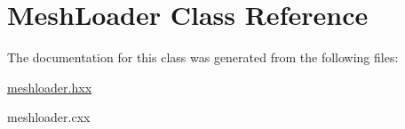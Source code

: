 \hypertarget{classMeshLoader}{\section{Mesh\-Loader Class Reference}
\label{classMeshLoader}
}


The documentation for this class was generated from the following files\-:\begin{DoxyCompactItemize}
\item 
\hyperlink{meshloader_8hxx}{meshloader.\-hxx}\item 
meshloader.\-cxx\end{DoxyCompactItemize}
